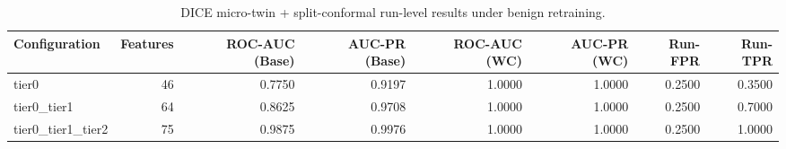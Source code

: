 \begin{table}[t]
\centering
\caption{DICE micro-twin + split-conformal run-level results under benign retraining.}
\label{tab:dice_full_overall}
\footnotesize
\begin{tabular}{lrrrrrrr}
\toprule
Configuration & Features & ROC-AUC (Base) & AUC-PR (Base) & ROC-AUC (WC) & AUC-PR (WC) & Run-FPR & Run-TPR \\
\midrule
tier0 & 46 & 0.7750 & 0.9197 & 1.0000 & 1.0000 & 0.2500 & 0.3500 \\
tier0_tier1 & 64 & 0.8625 & 0.9708 & 1.0000 & 1.0000 & 0.2500 & 0.7000 \\
tier0_tier1_tier2 & 75 & 0.9875 & 0.9976 & 1.0000 & 1.0000 & 0.2500 & 1.0000 \\
\bottomrule
\end{tabular}

\end{table}
